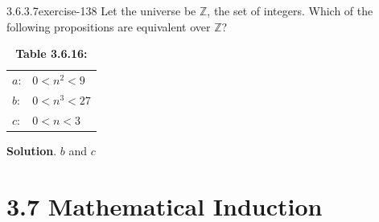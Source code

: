 \documentclass[twoside,10pt,]{book}
\numberwithin{equation}{section}
\begin{document}
\begin{divisionsolution}{3.6.3.7}{}{exercise-138}%
\hypertarget{p-1299}{}%
Let the universe be \(\mathbb{Z}\), the set of integers. Which of the following propositions are equivalent over \(\mathbb{Z}\)?%
\begin{table}
\centering
\begin{tabular}{ll}
\(a\):&\(0 < n^2 < 9\)\tabularnewline[0pt]
\(b\):&\(0 < n^3 < 27\)\tabularnewline[0pt]
\(c\):&\(0 < n < 3\)
\end{tabular}
\caption*{\textbf{Table 3.6.16:} }
\end{table}
\par\smallskip%
\noindent\textbf{Solution}.\quad%
\hypertarget{p-1300}{}%
\(b\) and \(c\)%
\end{divisionsolution}%
\section*{3.7 Mathematical Induction}
\end{document}
